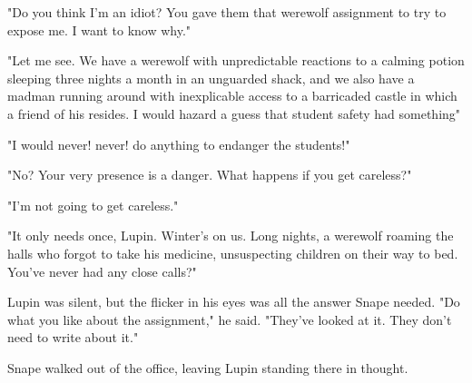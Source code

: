 "Do you think I'm an idiot? You gave them that werewolf assignment to try to expose me. I want to know why."

"Let me see. We have a werewolf with unpredictable reactions to a calming potion sleeping three nights a month in an unguarded shack, and we also have a madman running around with inexplicable access to a barricaded castle in which a friend of his resides. I would hazard a guess that student safety had something{\el}"

"I would never! never! do anything to endanger the students!"

"No? Your very presence is a danger. What happens if you get careless?"

"I'm not going to get careless."

"It only needs once, Lupin. Winter's on us. Long nights, a werewolf roaming the halls who forgot to take his medicine, unsuspecting children on their way to bed. You've never had any close calls?"

Lupin was silent, but the flicker in his eyes was all the answer Snape needed. "Do what you like about the assignment," he said. "They've looked at it. They don't need to write about it."

Snape walked out of the office, leaving Lupin standing there in thought.

